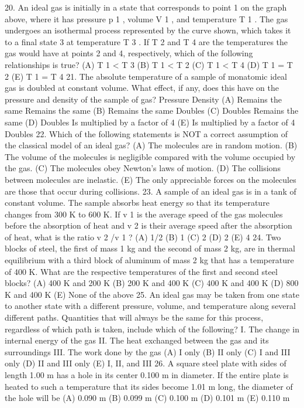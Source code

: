 20. An ideal gas is initially in a state that corresponds to point 1 on the graph above, where it has pressure p 1 ,
volume V 1 , and temperature T 1 . The gas undergoes an isothermal process represented by the curve shown,
which takes it to a final state 3 at temperature T 3 . If T 2 and T 4 are the temperatures the gas would have at
points 2 and 4, respectively, which of the following relationships is true?
(A) T 1 < T 3
(B) T 1 < T 2
(C) T 1 < T 4
(D) T 1 = T 2
(E) T 1 = T 4
21. The absolute temperature of a sample of monatomic ideal gas is doubled at constant volume. What effect, if
any, does this have on the pressure and density of the sample of gas?
Pressure
Density
(A) Remains the same
Remains the same
(B) Remains the same
Doubles
(C) Doubles
Remains the same
(D) Doubles
Is multiplied by a factor of 4
(E) Is multiplied by a factor of 4
Doubles
22. Which of the following statements is NOT a correct assumption of the classical model of an ideal gas?
(A) The molecules are in random motion.
(B) The volume of the molecules is negligible compared with the volume occupied by the gas.
(C) The molecules obey Newton's laws of motion.
(D) The collisions between molecules are inelastic.
(E) The only appreciable forces on the molecules are those that occur during collisions.
23. A sample of an ideal gas is in a tank of constant volume. The sample absorbs heat energy so that its temperature
changes from 300 K to 600 K. If v 1 is the average speed of the gas molecules before the absorption of heat and
v 2 is their average speed after the absorption of heat, what is the ratio v 2 /v 1 ?
(A) 1/2
(B) 1
(C)
2
(D) 2
(E) 4
24. Two blocks of steel, the first of mass 1 kg and the second of mass 2 kg, are in thermal equilibrium with a third
block of aluminum of mass 2 kg that has a temperature of 400 K. What are the respective temperatures of the
first and second steel blocks?
(A) 400 K and 200 K
(B) 200 K and 400 K
(C) 400 K and 400 K
(D) 800 K and 400 K
(E) None of the above
25. An ideal gas may be taken from one state to another state with a different pressure, volume, and temperature
along several different paths. Quantities that will always be the same for this process, regardless of which path
is taken, include which of the following?
I. The change in internal energy of the gas
II. The heat exchanged between the gas and its surroundings
III. The work done by the gas
(A) I only
(B) II only
(C) I and III only
(D) II and III only
(E) I, II, and III
26. A square steel plate with sides of length 1.00 m has a hole in its center 0.100 m in diameter. If the entire plate is
heated to such a temperature that its sides become 1.01 m long, the diameter of the hole will be
(A) 0.090 m
(B) 0.099 m
(C) 0.100 m
(D) 0.101 m
(E) 0.110 m



